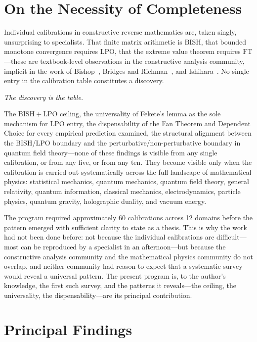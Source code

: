 \documentclass[11pt,a4paper]{report}
\theoremstyle{plain}
\theoremstyle{definition}
\theoremstyle{remark}
\newcommand{\BISH}{\mathrm{BISH}}
\newcommand{\LPO}{\mathrm{LPO}}
\newcommand{\FT}{\mathrm{FT}}
\begin{document}
\section{On the Necessity of Completeness}

Individual calibrations in constructive reverse mathematics are, taken singly, unsurprising to specialists.  That finite matrix arithmetic is $\BISH$, that bounded monotone convergence requires $\LPO$, that the extreme value theorem requires $\FT$---these are textbook-level observations in the constructive analysis community, implicit in the work of Bishop~\cite{Bishop1967}, Bridges and Richman~\cite{BridgesRichman1987}, and Ishihara~\cite{Ishihara2006}.  No single entry in the calibration table constitutes a discovery.

\emph{The discovery is the table.}

The $\BISH+\LPO$ ceiling, the universality of Fekete's lemma as the sole mechanism for $\LPO$ entry, the dispensability of the Fan Theorem and Dependent Choice for every empirical prediction examined, the structural alignment between the $\BISH$/$\LPO$ boundary and the perturbative/non-perturbative boundary in quantum field theory---none of these findings is visible from any single calibration, or from any five, or from any ten.  They become visible only when the calibration is carried out systematically across the full landscape of mathematical physics: statistical mechanics, quantum mechanics, quantum field theory, general relativity, quantum information, classical mechanics, electrodynamics, particle physics, quantum gravity, holographic duality, and vacuum energy.

The program required approximately 60 calibrations across 12 domains before the pattern emerged with sufficient clarity to state as a thesis.  This is why the work had not been done before: not because the individual calibrations are difficult---most can be reproduced by a specialist in an afternoon---but because the constructive analysis community and the mathematical physics community do not overlap, and neither community had reason to expect that a systematic survey would reveal a universal pattern.  The present program is, to the author's knowledge, the first such survey, and the patterns it reveals---the ceiling, the universality, the dispensability---are its principal contribution.

\section{Principal Findings}
\end{document}
